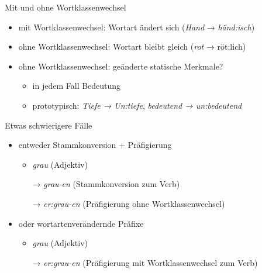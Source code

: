 \begin{frame}
  {Mit und ohne Wortklassenwechsel}
  \pause
  \begin{itemize}[<+->]
    \item mit Wortklassenwechsel: Wortart ändert sich (\textit{Hand} → \textit{händ:isch})
    \item ohne Wortklassenwechsel: Wortart bleibt gleich (\textit{rot} → röt:lich)
      \Zeile
    \item ohne Wortklassenwechsel: geänderte statische Merkmale?
      \begin{itemize}[<+->]
        \item in jedem Fall \alert{Bedeutung}
        \item prototypisch: \textit{Tiefe → Un:tiefe}, \textit{bedeutend → un:bedeutend}
      \end{itemize}
  \end{itemize}
\end{frame}

\begin{frame}
  {Etwas schwierigere Fälle}
  \pause
  \begin{exe}
    \ex
    \begin{xlist}
    \end{xlist}
    \pause
    \ex
    \begin{xlist}
    \end{xlist}
  \end{exe}
  \pause
  \Halbzeile
  \begin{itemize}[<+->]
    \item entweder \alert{Stammkonversion + Präfigierung}
      \begin{itemize}[<+->]
        \item \textit{grau} (Adjektiv)
        \item[→] \textit{grau-en} (Stammkonversion zum Verb)
        \item[→] \textit{er:grau-en} (Präfigierung ohne Wortklassenwechsel)
      \end{itemize}
    \item oder \alert{wortartenverändernde Präfixe}
      \begin{itemize}[<+->]
        \item \textit{grau} (Adjektiv)
        \item[→] \textit{er:grau-en} (Präfigierung mit Wortklassenwechsel zum Verb)
      \end{itemize}
  \end{itemize}
\end{frame}

